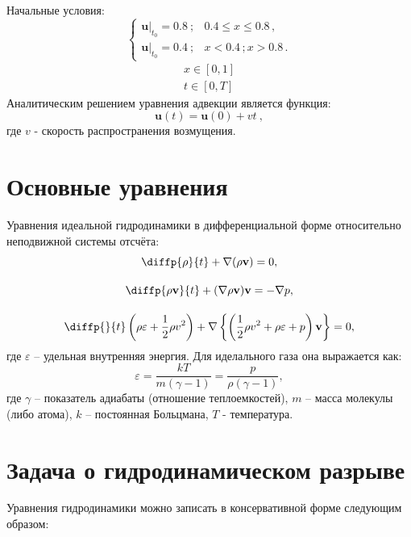 \documentclass[a4paper]{article}
\begin{document}
	Начальные условия:
	\begin{equation}
		\begin{cases}
			\left.\mathbf{u}\right|_{t_0} = 0.8\:;		&		0.4 \leqslant x \leqslant 0.8 \, ,	\\
			\left.\mathbf{u}\right|_{t_0} = 0.4\:;		&		x < 0.4\,; x > 0.8 \, .
		\end{cases}
	\end{equation}
	\[
		\begin{aligned}
			x \in [0, 1] \\
			t \in [0, T]
		\end{aligned}
	\]
	Аналитическим решением уравнения адвекции является функция:
	\begin{equation}
		\mathbf{u}(t) = \mathbf{u}(0) + vt \: ,
	\end{equation}
	где $v$ - скорость распространения возмущения.
	
	
	
	\section{Основные уравнения}
	Уравнения идеальной гидродинамики в дифференциальной форме относительно неподвижной системы отсчёта:
	\begin{gather}
		\diffp{\rho}{t} + \nabla ( \rho \mathbf{v} ) = 0 ,	\\[10pt]
		\diffp{\rho \mathbf{v}}{t} + (\nabla \rho \mathbf{v}) \mathbf{v} = -\nabla p ,	\\[10pt]
		\diffp{}{t}\left(\rho \varepsilon + \frac{1}{2} \rho v^2 \right) + 
						\nabla \left\{ \left( \frac{1}{2} \rho v^2 + \rho \varepsilon + p \right)\mathbf{v}\right\} = 0 ,
	\end{gather}
	где $\varepsilon$ -- удельная внутренняя энергия. Для иделального газа она выражается как:
	\begin{equation}
		\varepsilon = \dfrac{kT}{m(\gamma-1)} = \dfrac{p}{\rho (\gamma - 1)} ,
	\end{equation}
	где $\gamma$ -- показатель адиабаты (отношение теплоемкостей), $m$ -- масса молекулы (либо атома), $k$ -- постоянная Больцмана, $T$ - температура. 

	\section{Задача о гидродинамическом разрыве}\label{hydrodynamics}
	Уравнения гидродинамики можно записать в консервативной форме следующим образом:
	
\end{document}
